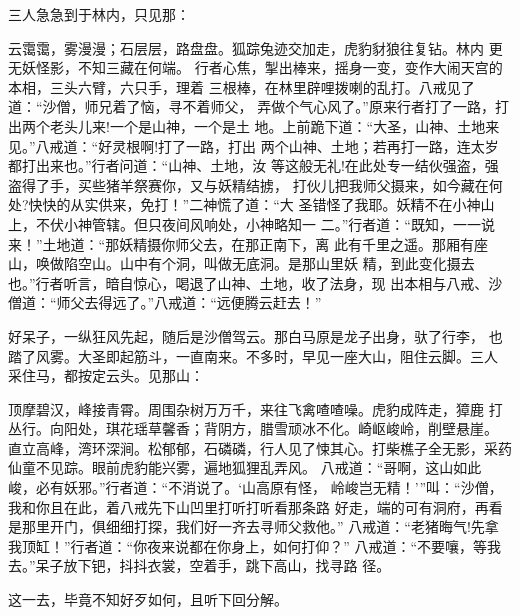 三人急急到于林内，只见那：

云霭霭，雾漫漫；石层层，路盘盘。狐踪兔迹交加走，虎豹豺狼往复钻。林内
更无妖怪影，不知三藏在何端。
行者心焦，掣出棒来，摇身一变，变作大闹天宫的本相，三头六臂，六只手，理着
三根棒，在林里辟哩拨喇的乱打。八戒见了道：“沙僧，师兄着了恼，寻不着师父，
弄做个气心风了。”原来行者打了一路，打出两个老头儿来!一个是山神，一个是土
地。上前跪下道：“大圣，山神、土地来见。”八戒道：“好灵根啊!打了一路，打出
两个山神、土地；若再打一路，连太岁都打出来也。”行者问道：“山神、土地，汝
等这般无礼!在此处专一结伙强盗，强盗得了手，买些猪羊祭赛你，又与妖精结掳，
打伙儿把我师父摄来，如今藏在何处?快快的从实供来，免打！”二神慌了道：“大
圣错怪了我耶。妖精不在小神山上，不伏小神管辖。但只夜间风响处，小神略知一
二。”行者道：“既知，一一说来！”土地道：“那妖精摄你师父去，在那正南下，离
此有千里之遥。那厢有座山，唤做陷空山。山中有个洞，叫做无底洞。是那山里妖
精，到此变化摄去也。”行者听言，暗自惊心，喝退了山神、土地，收了法身，现
出本相与八戒、沙僧道：“师父去得远了。”八戒道：“远便腾云赶去！”

好呆子，一纵狂风先起，随后是沙僧驾云。那白马原是龙子出身，驮了行李，
也踏了风雾。大圣即起筋斗，一直南来。不多时，早见一座大山，阻住云脚。三人
采住马，都按定云头。见那山：

顶摩碧汉，峰接青霄。周围杂树万万千，来往飞禽喳喳噪。虎豹成阵走，獐鹿
打丛行。向阳处，琪花瑶草馨香；背阴方，腊雪顽冰不化。崎岖峻岭，削壁悬崖。
直立高峰，湾环深涧。松郁郁，石磷磷，行人见了悚其心。打柴樵子全无影，采药
仙童不见踪。眼前虎豹能兴雾，遍地狐狸乱弄风。
八戒道：“哥啊，这山如此峻，必有妖邪。”行者道：“不消说了。‘山高原有怪，
岭峻岂无精！’”叫：“沙僧，我和你且在此，着八戒先下山凹里打听打听看那条路
好走，端的可有洞府，再看是那里开门，俱细细打探，我们好一齐去寻师父救他。”
八戒道：“老猪晦气!先拿我顶缸！”行者道：“你夜来说都在你身上，如何打仰？”
八戒道：“不要嚷，等我去。”呆子放下钯，抖抖衣裳，空着手，跳下高山，找寻路
径。

这一去，毕竟不知好歹如何，且听下回分解。
